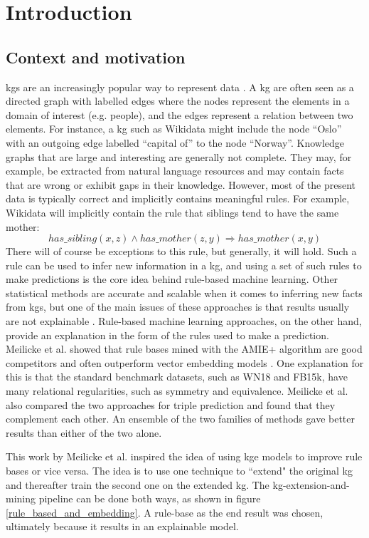 \chapter{Introduction}
\section{Context and motivation}
\Glspl{kg} are an increasingly popular way to represent data \cite{hogan2020knowledge}.
A \gls{kg} are often seen as a directed graph with labelled edges where the nodes represent the elements in a domain of interest (e.g. people), and the edges represent a relation between two elements. For instance, a \gls{kg} such as Wikidata might include the node ``Oslo'' with an outgoing edge labelled ``capital of'' to the node ``Norway''. Knowledge graphs that are large and interesting are generally not complete. They may, for example, be extracted from natural language resources and may contain facts that are wrong or exhibit gaps in their knowledge. However, most of the present data is typically correct and implicitly contains meaningful rules. For example, Wikidata will implicitly contain the rule that siblings tend to have the same mother:
\[has\_sibling(x, z) \wedge has\_mother(z, y) \Rightarrow has\_mother(x, y)\]
There will of course be exceptions to this rule, but generally, it will hold. Such a rule can be used to infer new information in a \gls{kg}, and using a set of such rules to make predictions is the core idea behind rule-based machine learning. Other statistical methods are accurate and scalable when it comes to inferring new facts from \glspl{kg}, but one of the main issues of these approaches is that results usually are not explainable \cite{bonatti2019knowledge}. Rule-based machine learning approaches, on the other hand, provide an explanation in the form of the rules used to make a prediction. Meilicke et al. showed that rule bases mined with the AMIE+ algorithm are good competitors and often outperform vector embedding models \cite{ensemble}. One explanation for this is that the standard benchmark datasets, such as WN18 and FB15k,  have many relational regularities, such as symmetry and equivalence. Meilicke et al. also compared the two approaches for triple prediction and found that they complement each other. An ensemble of the two families of methods gave better results than either of the two alone.

This work by Meilicke et al. inspired the idea of using \gls{kge} models to improve rule bases or vice versa. The idea is to use one technique to ``extend" the original \gls{kg} and thereafter train the second one on the extended \gls{kg}. The \gls{kg}-extension-and-mining pipeline can be done both ways, as shown in figure \ref{rule_based_and_embedding}. A rule-base as the end result was chosen, ultimately because it results in an explainable model. 

